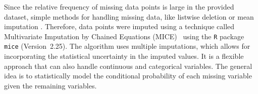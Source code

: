 Since the relative frequency of missing data points is large in the provided dataset,
simple methods for handling missing data, like listwise deletion or mean imputation . Therefore, data points were imputed using a technique called
Multivariate Imputation by Chained Equations
(MICE)~\cite{buuren2011mice} using the \texttt{R} package
\texttt{mice} (Version~2.25). The algorithm uses multiple imputations,
which allows for incorporating the statistical uncertainty in the
imputed values. It is a flexible approach that can also handle
continuous and categorical variables. The general idea is to statistically model the
conditional probability of each missing variable given the remaining
variables.